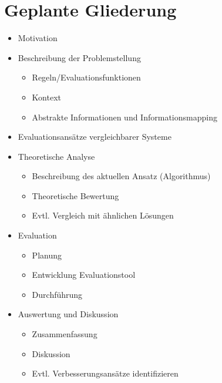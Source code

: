 \section{Geplante Gliederung}
\vspace{-1em}
\begin{itemize}
    \item  Motivation
    \item  Beschreibung der Problemstellung
    \begin{itemize}
        \item  Regeln/Evaluationsfunktionen
        \item  Kontext
        \item  Abstrakte Informationen und Informationsmapping
    \end{itemize}
    \item  Evaluationsansätze vergleichbarer Systeme
    \item  Theoretische Analyse
    \begin{itemize}
        \item  Beschreibung des aktuellen Ansatz (Algorithmus)
        \item  Theoretische Bewertung
        \item  Evtl. Vergleich mit ähnlichen Lösungen
    \end{itemize}
    \item  Evaluation
    \begin{itemize}
        \item  Planung
        \item  Entwicklung Evaluationstool
        \item  Durchführung
    \end{itemize}
    \item  Auswertung und Diskussion
     \begin{itemize}
     	\item  Zusammenfassung
     	\item  Diskussion
        \item  Evtl. Verbesserungsansätze identifizieren
    \end{itemize}
\end{itemize}


